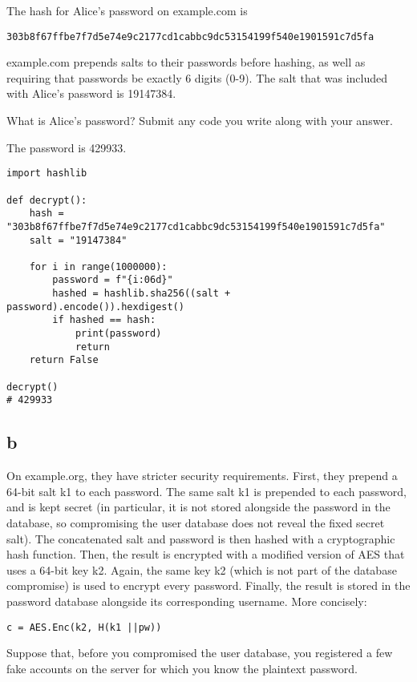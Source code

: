 \documentclass[11pt]{article}
\begin{document}
The hash for Alice's password on example.com is

\begin{verbatim}
303b8f67ffbe7f7d5e74e9c2177cd1cabbc9dc53154199f540e1901591c7d5fa
\end{verbatim}

example.com prepends salts to their passwords before hashing, as well as requiring that passwords be exactly 6 digits (0-9). The salt that was included with Alice's password is 19147384.

What is Alice's password? Submit any code you write along with your answer.

The password is 429933.

\begin{verbatim}
import hashlib

def decrypt():
    hash = "303b8f67ffbe7f7d5e74e9c2177cd1cabbc9dc53154199f540e1901591c7d5fa"
    salt = "19147384"

    for i in range(1000000):
        password = f"{i:06d}"
        hashed = hashlib.sha256((salt + password).encode()).hexdigest()
        if hashed == hash:
            print(password)
            return
    return False

decrypt()
# 429933
\end{verbatim}

\subsection{b}

On example.org, they have stricter security requirements. First, they prepend a 64-bit salt k1 to each password. The same salt k1 is prepended to each password, and is kept secret (in particular, it is not stored alongside the password in the database, so compromising the user database does not reveal the fixed secret salt). The concatenated salt and password is then hashed with a cryptographic hash function. Then, the result is encrypted with a modified version of AES that uses a 64-bit key k2. Again, the same key k2 (which is not part of the database compromise) is used to encrypt every password. Finally, the result is stored in the password database alongside its corresponding username. More concisely:

\begin{verbatim}
c = AES.Enc(k2, H(k1 ||pw))
\end{verbatim}

Suppose that, before you compromised the user database, you registered a few fake accounts on the server for which you know the plaintext password.
\end{document}
